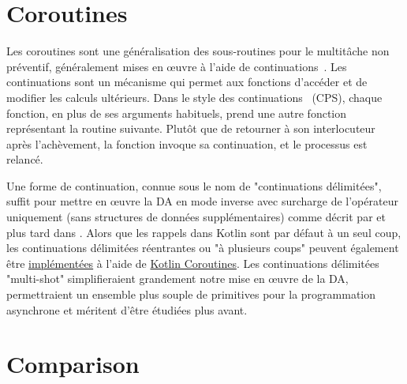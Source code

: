 \section{Coroutines}\label{sec:coroutines}

Les coroutines sont une généralisation des sous-routines pour le multitâche non préventif, généralement mises en œuvre à l'aide de continuations~\citep{haynes1984continuations}. Les continuations sont un mécanisme qui permet aux fonctions d'accéder et de modifier les calculs ultérieurs. Dans le style des continuations~\citep{sussman1975scheme} (CPS), chaque fonction, en plus de ses arguments habituels, prend une autre fonction représentant la routine suivante. Plutôt que de retourner à son interlocuteur après l'achèvement, la fonction invoque sa continuation, et le processus est relancé.

Une forme de continuation, connue sous le nom de "continuations délimitées", suffit pour mettre en œuvre la DA en mode inverse avec surcharge de l'opérateur uniquement (sans structures de données supplémentaires) comme décrit par \citet{wang2018demystifying} et plus tard dans \citet{wang2018backpropagation}. Alors que les rappels dans Kotlin sont par défaut à un seul coup, les continuations délimitées réentrantes ou "à plusieurs coups" peuvent également être \href{https://gist.github.com/elizarov/ddee47f927dda500dc493e945128d661}{implémentées} à l'aide de \href{https://kotlinlang.org/docs/reference/coroutines-overview.html}{Kotlin Coroutines}. Les continuations délimitées "multi-shot" simplifieraient grandement notre mise en œuvre de la DA, permettraient un ensemble plus souple de primitives pour la programmation asynchrone et méritent d'être étudiées plus avant.

\section{Comparison}\label{sec:comparison}

